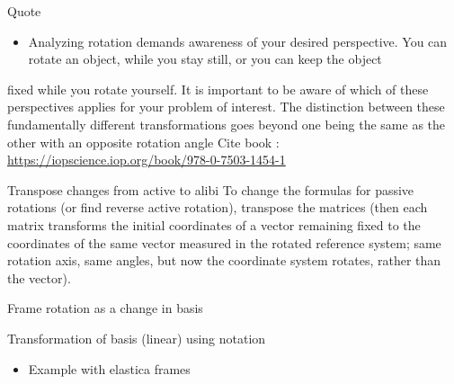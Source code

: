 \documentclass[presentation]{beamer}
\begin{document}
\begin{frame}[label={sec:orgf0d476c}]{Quote}
\begin{itemize}
\item Analyzing rotation demands awareness of your desired perspective. You can rotate an object, while you stay still, or you can keep the object
\end{itemize}
fixed while you rotate yourself. It is important to be aware of which of these
perspectives applies for your problem of interest. The distinction between
these fundamentally different transformations goes beyond one being the
same as the other with an opposite rotation angle
Cite book : \url{https://iopscience.iop.org/book/978-0-7503-1454-1}
\end{frame}
\begin{frame}[label={sec:orgff15af9}]{Transpose changes from active to alibi}
To change the formulas for passive rotations (or find reverse active rotation),
transpose the matrices (then each matrix transforms the initial coordinates of a
vector remaining fixed to the coordinates of the same vector measured in the
rotated reference system; same rotation axis, same angles, but now
the coordinate system rotates, rather than the vector).
\end{frame}
\begin{frame}[label={sec:orge3469cd}]{Frame rotation as a change in basis}
\begin{block}{Transformation of basis (linear) using notation}
\begin{itemize}
\item Example with elastica frames
\end{itemize}
\end{block}
\end{frame}
\end{document}
